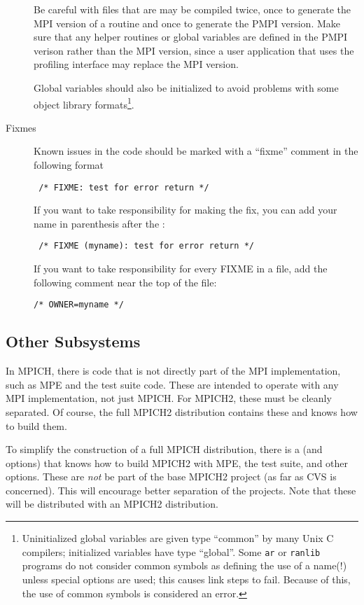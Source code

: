 \documentclass{article}
\begin{document}
\begin{description}
Be careful with files that are may be compiled twice, once to generate
the MPI version of a routine and once to generate the PMPI version.
Make sure that any helper routines or global variables are defined in
the PMPI verison rather than the MPI version, since a user application
that uses the profiling interface may replace the MPI version.

Global variables should also be initialized to avoid problems with
some object library formats\footnote{Uninitialized global variables
are given type ``common'' by many Unix C compilers; initialized
variables have type ``global''.  Some \texttt{ar} or \texttt{ranlib}
programs do not consider common symbols as defining the use of a name(!)
unless special options are used; this causes link steps to fail.
Because of this, the use of common symbols is considered an error.}. 

\item[Fixmes]Known issues in the code should be marked with a
  ``fixme'' comment in the following format
\begin{verbatim}
 /* FIXME: test for error return */
\end{verbatim}
If you want to take responsibility for making the fix, you can add
your name in parenthesis after the :
\begin{verbatim}
 /* FIXME (myname): test for error return */
\end{verbatim}

If you want to take responsibility for every FIXME in a file, add the
following comment near the top of the file:
\begin{verbatim}
/* OWNER=myname */
\end{verbatim}


\end{description}

\subsection{Other Subsystems}
In MPICH, there is code that is not directly part of the MPI
implementation, such as MPE and the test suite code.  These are intended to
operate with any MPI implementation, not just MPICH.
For MPICH2, these must be cleanly separated.  Of course, the full MPICH2
distribution contains these and knows how to build them.

To simplify the construction of a
full MPICH distribution, there is a  (and 
options) that knows how to build MPICH2 with MPE, 
the test 
suite, and other options.  These are \emph{not} be part of the base
MPICH2 project (as far as CVS is concerned).  This will encourage
better separation of the projects.  Note that these will be distributed with
an MPICH2 distribution.  
\end{document}
